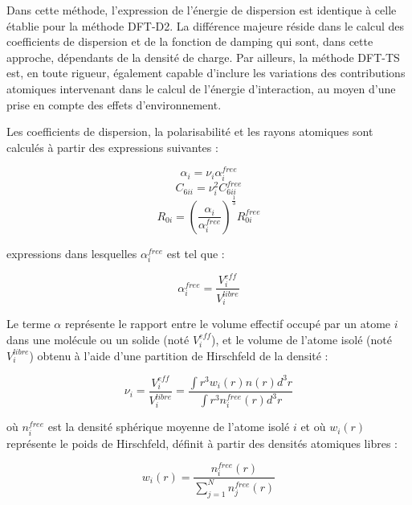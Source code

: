 {	Dans cette méthode, l’expression de l'énergie de dispersion est identique à celle établie pour la méthode DFT-D2. La différence majeure réside dans le calcul des coefficients de dispersion et de la fonction de damping qui sont, dans cette approche, dépendants de la densité de charge. Par ailleurs, la méthode DFT-TS est, en toute rigueur, également capable d'inclure les variations des contributions atomiques intervenant dans le calcul de l’énergie d’interaction, au moyen d'une prise en compte des effets d'environnement. 
	
	Les coefficients de dispersion, la polarisabilité et les rayons atomiques sont calculés à partir des expressions suivantes :
	
	
		\begin{equation} \alpha_{i} = \nu_{i} \alpha_{i}^{free} \end{equation}
		\begin{equation} C_{6ii} = \nu_{i}^{2} C_{6ii}^{free} \end{equation}
		\begin{equation} R_{0i} = \left(\frac{\alpha_{i}}{\alpha_{i}^{free}}\right)^{\frac{1}{3}} R_{0i}^{free} \end{equation}

	
	\noindent expressions dans lesquelles $\alpha_{i}^{free}$ est tel que :
	
	\begin{equation}
	\alpha_{i}^{free} = \frac{V_{i}^{eff}}{V_{i}^{libre}}
	\end{equation}
	
	Le terme $\alpha$ représente le rapport entre le volume effectif occupé par un atome $i$ dans une molécule ou un solide (noté $V_{i}^{eff}$), et le volume de l’atome isolé (noté $V_{i}^{libre}$) obtenu à l’aide d’une partition de Hirschfeld de la densité :
	
	\begin{equation}
	\nu_{i} = \frac{V_{i}^{eff}}{V_{i}^{libre}} = \frac{\int r^{3} w_{i}(r)n(r)d^{3}r}{\int r^{3} n_{i}^{free} (r)d^{3}r}
	\end{equation}
	
	où $n_{i}^{free}$ est la densité sphérique moyenne de l’atome isolé $i$ et où $w_{i}(r)$ représente le poids de Hirschfeld, définit à partir des densités atomiques libres : 
	
	\begin{equation}
	w_{i}(r)= \frac{n_{i}^{free}(r)}{\sum_{j=1}^{N} n_{j}^{free}(r)}
	\end{equation}
	\bigskip
	
}
